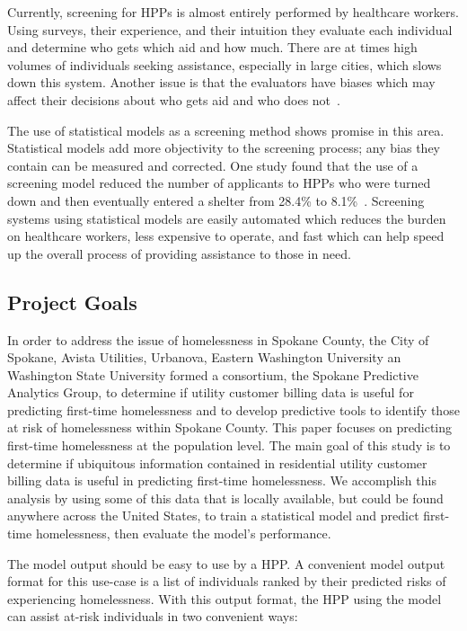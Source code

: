 \documentclass[10pt,letterpaper]{article}
\begin{document}
Currently, screening for HPPs is almost entirely performed by healthcare workers. Using surveys, their experience, and their intuition they evaluate each individual and determine who gets which aid and how much. There are at times high volumes of individuals seeking assistance, especially in large cities, which slows down this system. Another issue is that the evaluators have biases which may affect their decisions about who gets aid and who does not~\cite{shinn2019homelessness}.

The use of statistical models as a screening method shows promise in this area. Statistical models add more objectivity to the screening process; any bias they contain can be measured and corrected. One study found that the use of a screening model reduced the number of applicants to HPPs who were turned down and then eventually entered a shelter from 28.4\% to 8.1\%~\cite{shinn2019homelessness}. Screening systems using statistical models are easily automated which reduces the burden on healthcare workers, less expensive to operate, and fast which can help speed up the overall process of providing assistance to those in need.

\subsection*{Project Goals}
In order to address the issue of homelessness in Spokane County, the City of Spokane, Avista Utilities, Urbanova, Eastern Washington University an Washington State University formed a consortium, the Spokane Predictive Analytics Group, to determine if utility customer billing data is useful for predicting first-time homelessness and to develop predictive tools to identify those at risk of homelessness within Spokane County. This paper focuses on predicting first-time homelessness at the population level. The main goal of this study is to determine if ubiquitous information contained in residential utility customer billing data is useful in predicting first-time homelessness. We accomplish this analysis by using some of this data that is locally available, but could be found anywhere across the United States, to train a statistical model and predict first-time homelessness, then evaluate the model's performance. 

The model output should be easy to use by a HPP. A convenient model output format for this use-case is a list of individuals ranked by their predicted risks of experiencing homelessness. With this output format, the HPP using the model can assist at-risk individuals in two convenient ways:
\end{document}
